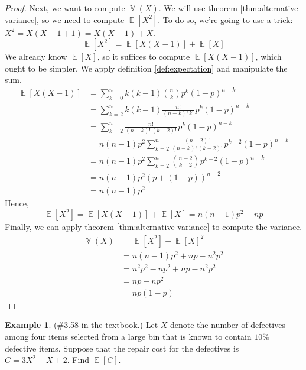 \documentclass[11pt,letterpaper]{article}
\theoremstyle{definition}
\newtheorem{eg}{Example}
\theoremstyle{remark}
\newcommand{\parens}[1]{\left(#1\right)}
\newcommand{\fact}{!\,}
\DeclareMathOperator{\Expect}{\mathbb{E}}
\newcommand{\E}[1]{\Expect{\left[#1\right]}}
\DeclareMathOperator{\Var}{\mathbb{V}}
\newcommand{\V}[1]{\Var{\parens{#1}}}
\begin{document}
\begin{proof}
    Next, we want to compute $\V{X}$.
    We will use theorem \ref{thm:alternative-variance}, so we need to compute
    $\E{X^2}$.
    To do so, we're going to use a trick: $X^2 = X(X - 1 + 1) = X(X-1) + X$.
    \begin{equation*}
        \E{X^2} = \E{X(X-1)} + \E{X}
    \end{equation*}
    We already know $\E{X}$, so it suffices to compute $\E{X(X-1)}$, which
    ought to be simpler. We apply definition \ref{def:expectation} and
    manipulate the sum.
    \begin{align*}
        \E{X(X-1)}
        &= \sum_{k=0}^n {
            k(k-1) {n \choose k} p^k (1-p)^{n-k}
        } \\
        &= \sum_{k=2}^n {
            k(k-1)
            \frac{n\fact}{(n-k)\fact k\fact}
            p^k (1-p)^{n-k}
        } \\
        &= \sum_{k=2}^n {
            \frac{n\fact}{(n-k)\fact (k-2)\fact}
            p^k (1-p)^{n-k}
        } \\
        &= n(n-1) p^2 \sum_{k=2}^n {
            \frac{(n-2)\fact}{(n-k)\fact (k-2)\fact}
            p^{k-2}
            (1-p)^{n-k}
        } \\
        &= n(n-1) p^2 \sum_{k=2}^n {
            {{n-2} \choose {k-2}} p^{k-2} (1-p)^{n-k}
        } \\
        &= n(n-1) p^2 (p + (1-p))^{n-2} \\
        &= n(n-1) p^2
    \end{align*}
    Hence,
    \begin{equation}
        \label{eq:bin-xx1}
        \E{X^2} = \E{X(X-1)} + \E{X} = n(n-1) p^2 + np
    \end{equation}
    Finally, we can apply theorem \ref{thm:alternative-variance} to compute the
    variance.
    \begin{align*}
        \label{eq:variance-binomial}
        \V{X}
        &= \E{X^2} - \E{X}^2 \\
        &= n(n-1) p^2 + np - n^2 p^2 \\
        &= n^2 p^2 - n p^2 + np - n^2 p^2 \\
        &= np - np^2 \\
        &= np(1-p)
    \end{align*}
\end{proof}

\begin{eg}{(\#3.58 in the textbook.)}
    Let $X$ denote the number of defectives among four items selected from a
    large bin that is known to contain $10\%$ defective items.
    Suppose that the repair cost for the defectives is $C = 3X^2 + X + 2$.
    Find $\E{C}$.
\end{eg}
\end{document}
